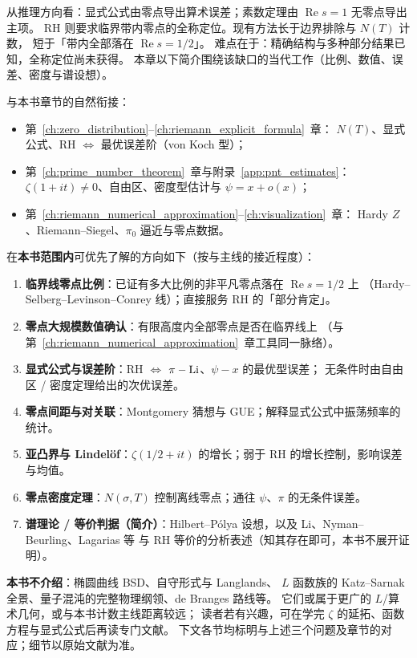从推理方向看：显式公式由零点导出算术误差；素数定理由 $\operatorname{Re}s=1$ 无零点导出主项。
RH 则要求临界带内零点的全称定位。现有方法长于边界排除与 $N(T)$ 计数，
短于「带内全部落在 $\operatorname{Re}s=1/2$」。
难点在于：精确结构与多种部分结果已知，全称定位尚未获得。
本章以下简介围绕该缺口的当代工作（比例、数值、误差、密度与谱设想）。

与本书章节的自然衔接：
\begin{itemize}
  \item 第~\ref{ch:zero_distribution}--\ref{ch:riemann_explicit_formula}~章：
        $N(T)$、显式公式、RH $\Leftrightarrow$ 最优误差阶（von Koch 型）；
  \item 第~\ref{ch:prime_number_theorem}~章与附录~\ref{app:pnt_estimates}：
        $\zeta(1+it)\neq 0$、自由区、密度型估计与 $\psi=x+o(x)$；
  \item 第~\ref{ch:riemann_numerical_approximation}--\ref{ch:visualization}~章：
        Hardy $Z$、Riemann--Siegel、$\pi_0$ 逼近与零点数据。
\end{itemize}

在\textbf{本书范围内}可优先了解的方向如下（按与主线的接近程度）：
\begin{enumerate}
  \item \textbf{临界线零点比例}：已证有多大比例的非平凡零点落在 $\operatorname{Re}s=1/2$ 上
        （Hardy--Selberg--Levinson--Conrey 线）；直接服务 RH 的「部分肯定」。
  \item \textbf{零点大规模数值确认}：有限高度内全部零点是否在临界线上
        （与第~\ref{ch:riemann_numerical_approximation}~章工具同一脉络）。
  \item \textbf{显式公式与误差阶}：RH $\Leftrightarrow$ $\pi-\operatorname{Li}$、$\psi-x$ 的最优型误差；
        无条件时由自由区 / 密度定理给出的次优误差。
  \item \textbf{零点间距与对关联}：Montgomery 猜想与 GUE；解释显式公式中振荡频率的统计。
  \item \textbf{亚凸界与 Lindelöf}：$\zeta(1/2+it)$ 的增长；弱于 RH 的增长控制，影响误差与均值。
  \item \textbf{零点密度定理}：$N(\sigma,T)$ 控制离线零点；通往 $\psi$、$\pi$ 的无条件误差。
  \item \textbf{谱理论 / 等价判据（简介）}：Hilbert--Pólya 设想，以及 Li、Nyman--Beurling、Lagarias 等
        与 RH 等价的分析表述（知其存在即可，本书不展开证明）。
\end{enumerate}
\textbf{本书不介绍}：椭圆曲线 BSD、自守形式与 Langlands、
$L$ 函数族的 Katz--Sarnak 全景、量子混沌的完整物理纲领、de Branges 路线等。
它们或属于更广的 $L$/算术几何，或与本书计数主线距离较远；
读者若有兴趣，可在学完 $\zeta$ 的延拓、函数方程与显式公式后再读专门文献。
下文各节均标明与上述三个问题及章节的对应；细节以原始文献为准。

